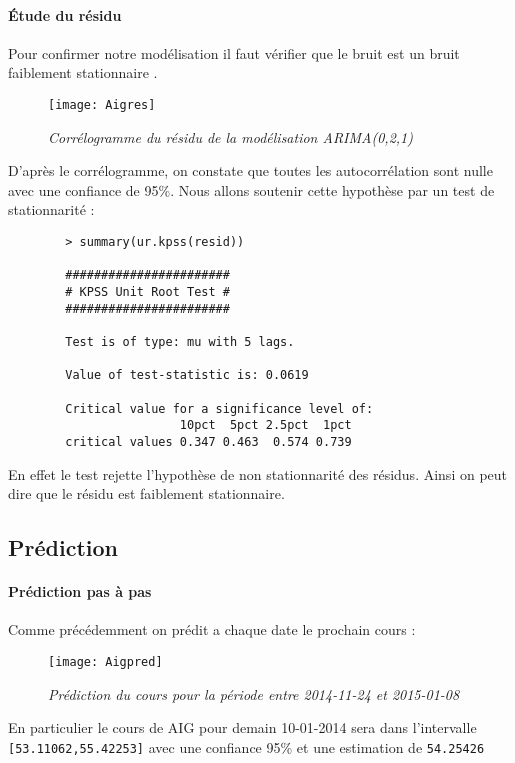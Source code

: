         \paragraph{Étude du résidu} Pour confirmer notre modélisation il faut
        vérifier que le bruit est un bruit faiblement stationnaire .
        \begin{figure}[H]
            \centering 
            \label{fig:Aigres} 
            \texttt{[image: Aigres]} 
            \caption{\it Corrélogramme du résidu de la modélisation ARIMA(0,2,1) } 
        \end{figure} 

        D'après le corrélogramme, on constate que toutes les autocorrélation
        sont nulle avec une confiance de 95\%.
        Nous allons soutenir cette hypothèse par un test de stationnarité :
        \begin{verbatim}
        > summary(ur.kpss(resid))

        ####################### 
        # KPSS Unit Root Test # 
        ####################### 

        Test is of type: mu with 5 lags. 

        Value of test-statistic is: 0.0619 

        Critical value for a significance level of: 
                        10pct  5pct 2.5pct  1pct
        critical values 0.347 0.463  0.574 0.739
        \end{verbatim}
        En effet le test rejette l'hypothèse de non stationnarité des résidus.
        Ainsi on peut dire que le résidu est faiblement stationnaire.
    \subsection{Prédiction}
    \paragraph{Prédiction pas à pas} Comme précédemment on prédit a chaque date
    le prochain cours :
    \begin{figure}[H]
        \centering 
        \label{fig:Aigpred} 
        \texttt{[image: Aigpred]} 
        \caption{\it Prédiction du cours pour la période entre 2014-11-24 et
        2015-01-08  } 
    \end{figure} 

    En particulier le cours de AIG pour demain 10-01-2014 sera dans
    l'intervalle \verb+[53.11062,55.42253]+ avec une confiance 95\% et une
    estimation de \verb+54.25426+
